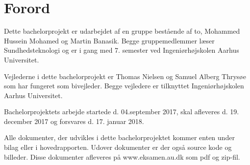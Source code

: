 \chapter{Forord}

Dette bachelorprojekt er udarbejdet af en gruppe bestående af to, Mohammed Hussein Mohamed og Martin Banasik. Begge gruppemedlemmer læser Sundhedsteknologi og er i gang med 7. semester ved Ingeniørhøjskolen Aarhus Universitet.

Vejlederne i dette bachelorprojekt er Thomas Nielsen og Samuel Alberg Thrysøe som har fungeret som bivejleder. Begge vejledere er tilknyttet Ingeniørhøjskolen Aarhus Universitet.

Bachelorprojektets arbejde startede d. 04.september 2017,  skal afleveres d. 19. december 2017 og forsvares d. 17. januar 2018.

Alle dokumenter, der udvikles i dette  bachelorprojektet kommer enten under bilag eller i hovedrapporten. Udover dokumenter er der også source kode og billeder. Disse dokumenter afleveres på  www.eksamen.au.dk som pdf og zip-fil. 